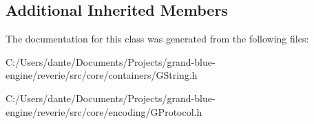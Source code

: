 \subsection*{Additional Inherited Members}


The documentation for this class was generated from the following files\+:\begin{DoxyCompactItemize}
\item 
C\+:/\+Users/dante/\+Documents/\+Projects/grand-\/blue-\/engine/reverie/src/core/containers/G\+String.\+h\item 
C\+:/\+Users/dante/\+Documents/\+Projects/grand-\/blue-\/engine/reverie/src/core/encoding/G\+Protocol.\+h\end{DoxyCompactItemize}
